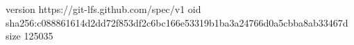 version https://git-lfs.github.com/spec/v1
oid sha256:c088861614d2dd72f853df2c6bc166e53319b1ba3a24766d0a5cbba8ab33467d
size 125035
